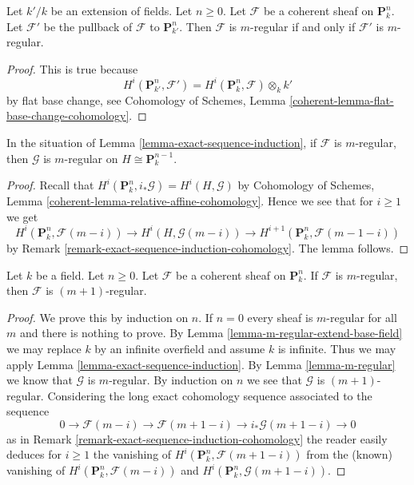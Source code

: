 \begin{lemma}
\label{lemma-m-regular-extend-base-field}
Let $k'/k$ be an extension of fields. Let $n \geq 0$.
Let $\mathcal{F}$ be a coherent sheaf on $\mathbf{P}^n_k$.
Let $\mathcal{F}'$ be the pullback of $\mathcal{F}$ to $\mathbf{P}^n_{k'}$.
Then $\mathcal{F}$ is $m$-regular if and only if $\mathcal{F}'$ is
$m$-regular.
\end{lemma}

\begin{proof}
This is true because
$$
H^i(\mathbf{P}^n_{k'}, \mathcal{F}') =
H^i(\mathbf{P}^n_k, \mathcal{F}) \otimes_k k'
$$
by flat base change, see
Cohomology of Schemes, Lemma \ref{coherent-lemma-flat-base-change-cohomology}.
\end{proof}

\begin{lemma}
\label{lemma-m-regular}
In the situation of Lemma \ref{lemma-exact-sequence-induction},
if $\mathcal{F}$ is $m$-regular, then $\mathcal{G}$ is $m$-regular
on $H \cong \mathbf{P}^{n - 1}_k$.
\end{lemma}

\begin{proof}
Recall that $H^i(\mathbf{P}^n_k, i_*\mathcal{G}) = H^i(H, \mathcal{G})$ by
Cohomology of Schemes, Lemma \ref{coherent-lemma-relative-affine-cohomology}.
Hence we see that for $i \geq 1$ we get
$$
H^i(\mathbf{P}^n_k, \mathcal{F}(m - i)) \to
H^i(H, \mathcal{G}(m - i)) \to
H^{i + 1}(\mathbf{P}^n_k, \mathcal{F}(m - 1 - i))
$$
by Remark \ref{remark-exact-sequence-induction-cohomology}.
The lemma follows.
\end{proof}

\begin{lemma}
\label{lemma-m-regular-up}
Let $k$ be a field. Let $n \geq 0$.
Let $\mathcal{F}$ be a coherent sheaf on $\mathbf{P}^n_k$.
If $\mathcal{F}$ is $m$-regular, then $\mathcal{F}$ is
$(m + 1)$-regular.
\end{lemma}

\begin{proof}
We prove this by induction on $n$. If $n = 0$ every sheaf is $m$-regular
for all $m$ and there is nothing to prove. By
Lemma \ref{lemma-m-regular-extend-base-field} we may replace $k$
by an infinite overfield and assume $k$ is infinite.
Thus we may apply Lemma \ref{lemma-exact-sequence-induction}.
By Lemma \ref{lemma-m-regular} we know that $\mathcal{G}$ is
$m$-regular. By induction on $n$ we see that $\mathcal{G}$ is
$(m + 1)$-regular. Considering the long exact cohomology sequence
associated to the sequence
$$
0 \to \mathcal{F}(m - i) \to \mathcal{F}(m + 1 - i)
\to i_*\mathcal{G}(m + 1 - i) \to 0
$$
as in Remark \ref{remark-exact-sequence-induction-cohomology}
the reader easily deduces for $i \geq 1$ the vanishing of
$H^i(\mathbf{P}^n_k, \mathcal{F}(m + 1 - i))$ from the (known) vanishing of
$H^i(\mathbf{P}^n_k, \mathcal{F}(m - i))$ and
$H^i(\mathbf{P}^n_k, \mathcal{G}(m + 1 - i))$.
\end{proof}

